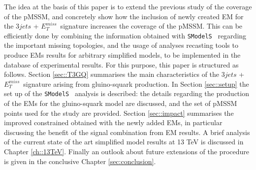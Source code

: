\documentclass[a4paper,11pt]{article}
\newcommand{\MET}{{ $E_T ^{miss}$}}
\newcommand{\SMO}{\texttt{SModelS\xspace}}
\begin{document}
%

The idea at the basis of this paper is to extend the previous study of the coverage of the pMSSM, and concretely show how the inclusion of newly created EM for the $3jets$ + \MET~signature increases the coverage of the pMSSM. This can be efficiently done by combining the information obtained with \SMO~ regarding the important missing topologies, and the usage of analyses recasting tools to produce EMs results for arbitrary simplified models, to be implemented in the database of experimental results. For this purpose, this paper is structured as follows. Section \ref{sec::T3GQ} summarises the main characteristics of the $3jets$ + \MET~signature arising from gluino-squark production. In Section \ref{sec::setup} the set up of the \SMO~ analysis is described: the details regarding the production of the EMs for the gluino-squark model are discussed, and the set of pMSSM points used for the study are provided. Section \ref{sec::impact} summarises the improved constrained obtained with the newly added EMs, in particular discussing the benefit of the signal combination from EM results. A brief analysis of the current state of the art simplified model results at 13 TeV is discussed in Chapter \ref{ch::13TeV}. Finally an outlook about future extensions of the procedure is given in the conclusive Chapter \ref{sec:conclusion}.  
%
\end{document}
